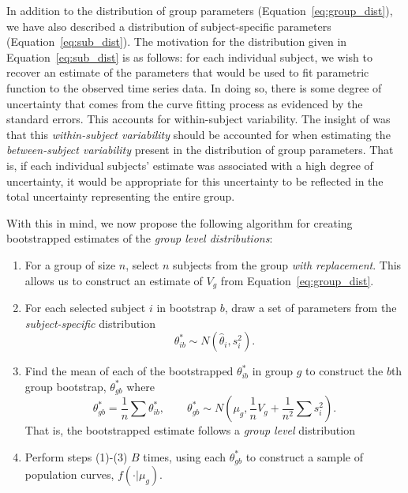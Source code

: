 In addition to the distribution of group parameters (Equation~\ref{eq:group_dist}), we have also described a distribution of subject-specific parameters (Equation~\ref{eq:sub_dist}). The motivation for the distribution given in Equation~\ref{eq:sub_dist} is as follows: for each individual subject, we wish to recover an estimate of the parameters that would be used to fit parametric function to the observed time series data. In doing so, there is some degree of uncertainty that comes from the curve fitting process as evidenced by the standard errors. This accounts for within-subject variability. The insight of \citet{oleson2017detecting} was that this \textit{within-subject variability} should be accounted for when estimating the \textit{between-subject variability} present in the distribution of group parameters. That is, if each individual subjects' estimate was associated with a high degree of uncertainty, it would be appropriate for this uncertainty to be reflected in the total uncertainty representing the entire group.

With this in mind, we now propose the following algorithm for creating bootstrapped estimates of the \textit{group level distributions}:




\begin{enumerate}
\item For a group of size $n$, select $n$ subjects from the group \textit{with replacement}. This allows us to construct an estimate of $V_{g}$ from Equation~\ref{eq:group_dist}.
\item For each selected subject $i$ in bootstrap $b$, draw a set of parameters from the \textit{subject-specific} distribution 
\begin{equation}
\theta_{ib}^* \sim N(\hat{\theta}_i, s_i^2).
\end{equation}
\item Find the mean of each of the bootstrapped $\theta_{ib}^*$ in group $g$ to construct the $b$th group bootstrap, $\theta_{gb}^*$ where
\begin{equation}\label{eq:het_boot_dist}
\theta_{gb}^* = \frac1n \sum  \theta_{ib}^*, \qquad \theta_{gb}^* \sim N \left(\mu_g, \frac{1}{n} V_g + \frac{1}{n^2} \sum s_i^2 \right).
\end{equation}
That is, the bootstrapped estimate follows a \textit{group level} distribution
\item Perform steps (1)-(3) $B$ times, using each $\theta_{gb}^*$ to construct a sample of population curves, $f(\cdot| \mu_g)$.
\end{enumerate}

